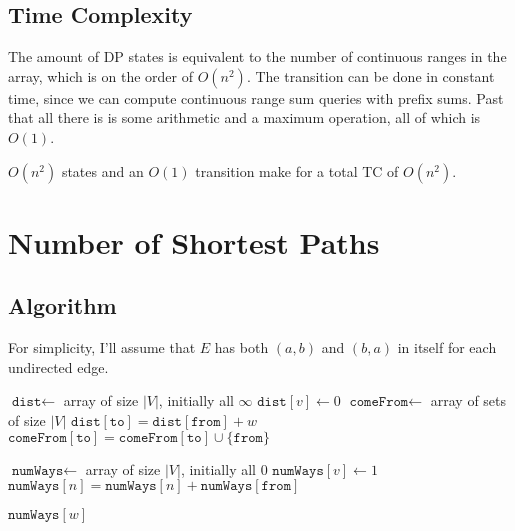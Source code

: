 \documentclass[12pt]{article}
\begin{document}
\subsection{Time Complexity}

The amount of DP states is equivalent to the number of continuous ranges
in the array, which is on the order of $O(n^2)$.
The transition can be done in constant time, since we can compute
continuous range sum queries with prefix sums.
Past that all there is is some arithmetic and a maximum operation,
all of which is $O(1)$.

$O(n^2)$ states and an $O(1)$ transition make for a total TC of $\boxed{O(n^2)}$.

\pagebreak

\section{Number of Shortest Paths}

\subsection{Algorithm}

For simplicity, I'll assume that $E$
has both $(a, b)$ and $(b, a)$ in itself for each undirected edge.

\begin{algorithmic}[1]
    \State $\texttt{dist} \gets$ array of size $|V|$, initially all $\infty$
    \State $\texttt{dist}[v] \gets 0$
    \State $\texttt{comeFrom} \gets$ array of sets of size $|V|$
                \State $\texttt{dist}[\texttt{to}]=\texttt{dist}[\texttt{from}]+w$
            \EndIf
                \State $\texttt{comeFrom}[\texttt{to}]=\texttt{comeFrom}[\texttt{to}] \cup \{\texttt{from}\}$
            \EndIf
        \EndFor
    \EndFor

    \item[]
    \State $\texttt{numWays} \gets$ array of size $|V|$, initially all $0$
    \State $\texttt{numWays}[v] \gets 1$
            \State $\texttt{numWays}[n]=\texttt{numWays}[n]+\texttt{numWays}[\texttt{from}]$
        \EndFor
    \EndFor

    \item[]
    \State \Return $\texttt{numWays}[w]$
\end{algorithmic}
\end{document}
